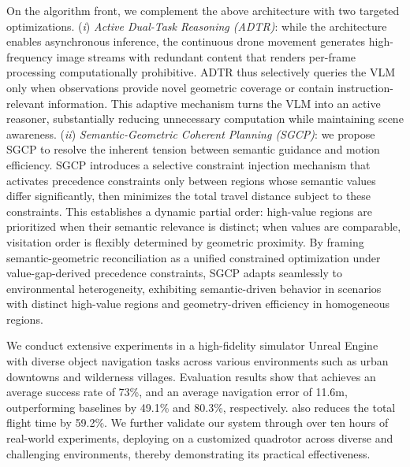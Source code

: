 On the algorithm front, we complement the above architecture with two targeted optimizations. 
(\textit{i}) \textit{Active Dual-Task Reasoning (ADTR)}: while the architecture enables asynchronous inference, the continuous drone movement generates high-frequency image streams with redundant content that renders per-frame processing computationally prohibitive. ADTR thus selectively queries the VLM only when observations provide novel geometric coverage or contain instruction-relevant information. This adaptive mechanism turns the VLM into an active reasoner, substantially reducing unnecessary computation while maintaining scene awareness.
(\textit{ii}) \textit{Semantic-Geometric Coherent Planning (SGCP)}: we propose SGCP to resolve the inherent tension between semantic guidance and motion efficiency. SGCP introduces a selective constraint injection mechanism that activates precedence constraints only between regions whose semantic values differ significantly, then minimizes the total travel distance subject to these constraints. This establishes a dynamic partial order: high-value regions are prioritized when their semantic relevance is distinct; when values are comparable, visitation order is flexibly determined by geometric proximity. 
By framing semantic-geometric reconciliation as a unified constrained optimization under value-gap-derived precedence constraints, SGCP adapts seamlessly to environmental heterogeneity, exhibiting semantic-driven behavior in scenarios with distinct high-value regions and geometry-driven efficiency in homogeneous regions.


We conduct extensive experiments in a high-fidelity simulator Unreal Engine~\cite{ue} with diverse object navigation tasks across various environments such as urban downtowns and wilderness villages. 
Evaluation results show that \sysname achieves an average success rate of 73\%, and an average navigation error of 11.6m, outperforming baselines by 49.1\% and 80.3\%, respectively. \sysname also reduces the total flight time by 59.2\%. We further validate our system through over ten hours of real-world experiments, deploying \sysname on a customized quadrotor across diverse and challenging environments, thereby demonstrating its practical effectiveness.

